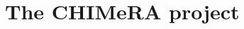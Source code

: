 \documentclass{standalone}
\begin{document}
\section[CHIMeRA]{The CHIMeRA project}\label{chimera:chimera}

\end{document}
